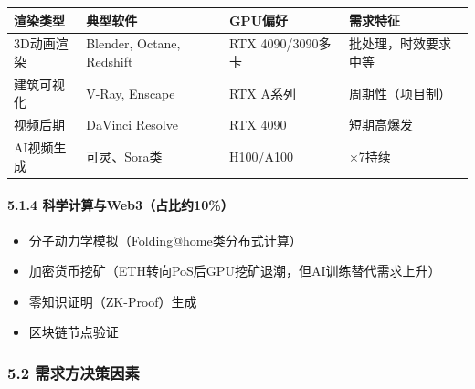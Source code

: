 \documentclass[UTF8,a4paper,12pt]{ctexart}
\begin{document}
{\def\LTcaptype{none} %
\begin{longtable}[]{@{}
  >{\raggedright\arraybackslash}p{}
  >{\raggedright\arraybackslash}p{}
  >{\raggedright\arraybackslash}p{}
  >{\raggedright\arraybackslash}p{}@{}}
\toprule\noalign{}
\begin{minipage}[b]{\linewidth}\raggedright
渲染类型
\end{minipage} & \begin{minipage}[b]{\linewidth}\raggedright
典型软件
\end{minipage} & \begin{minipage}[b]{\linewidth}\raggedright
GPU偏好
\end{minipage} & \begin{minipage}[b]{\linewidth}\raggedright
需求特征
\end{minipage} \\
\midrule\noalign{}
\endhead
\bottomrule\noalign{}
\endlastfoot
3D动画渲染 & Blender, Octane, Redshift & RTX 4090/3090多卡 &
批处理，时效要求中等 \\
建筑可视化 & V-Ray, Enscape & RTX A系列 & 周期性（项目制） \\
视频后期 & DaVinci Resolve & RTX 4090 & 短期高爆发 \\
AI视频生成 & 可灵、Sora类 & H100/A100 & 24×7持续 \\
\end{longtable}
}

\paragraph{5.1.4
科学计算与Web3（占比约10\%）}\label{ux79d1ux5b66ux8ba1ux7b97ux4e0eweb3ux5360ux6bd4ux7ea610}

\begin{itemize}
\tightlist
\item
  分子动力学模拟（Folding@home类分布式计算）
\item
  加密货币挖矿（ETH转向PoS后GPU挖矿退潮，但AI训练替代需求上升）
\item
  零知识证明（ZK-Proof）生成
\item
  区块链节点验证
\end{itemize}

\subsubsection{5.2
需求方决策因素}\label{ux9700ux6c42ux65b9ux51b3ux7b56ux56e0ux7d20}
\end{document}
